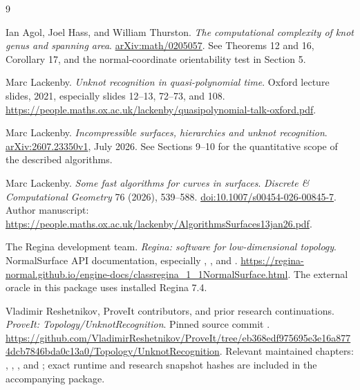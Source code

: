 \begin{thebibliography}{9}
\raggedright
{}
Ian Agol, Joel Hass, and William Thurston.
\emph{The computational complexity of knot genus and spanning area}.
\href{https://arxiv.org/abs/math/0205057}{arXiv:math/0205057}.
See Theorems 12 and 16, Corollary 17, and the normal-coordinate
orientability test in Section 5.

Marc Lackenby.
\emph{Unknot recognition in quasi-polynomial time}.
Oxford lecture slides, 2021, especially slides 12--13, 72--73, and 108.
\url{https://people.maths.ox.ac.uk/lackenby/quasipolynomial-talk-oxford.pdf}.

Marc Lackenby.
\emph{Incompressible surfaces, hierarchies and unknot recognition}.
\href{https://arxiv.org/abs/2607.23350}{arXiv:2607.23350v1}, July 2026.
See Sections 9--10 for the quantitative scope of the described algorithms.

Marc Lackenby.
\emph{Some fast algorithms for curves in surfaces}.
\emph{Discrete \& Computational Geometry} 76 (2026), 539--588.
\href{https://doi.org/10.1007/s00454-026-00845-7}{doi:10.1007/s00454-026-00845-7}.
Author manuscript:
\url{https://people.maths.ox.ac.uk/lackenby/AlgorithmsSurfaces13jan26.pdf}.

The Regina development team.
\emph{Regina: software for low-dimensional topology}.
NormalSurface API documentation, especially ,
, and .
\url{https://regina-normal.github.io/engine-docs/classregina_1_1NormalSurface.html}.
The external oracle in this package uses installed Regina 7.4.

Vladimir Reshetnikov, ProveIt contributors, and prior research continuations.
\emph{ProveIt: Topology/UnknotRecognition}.
Pinned source commit \baseline.
\url{https://github.com/VladimirReshetnikov/ProveIt/tree/eb368edf975695e3e16a8774dcb7846bda0c13a0/Topology/UnknotRecognition}.
Relevant maintained chapters: ,
, , and
; exact runtime and research snapshot hashes are
included in the accompanying package.
\end{thebibliography}

